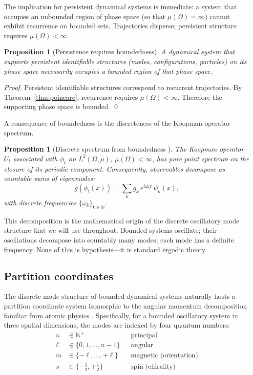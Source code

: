 \documentclass[twocolumn,11pt,a4paper]{article}
\newtheorem{proposition}[theorem]{Proposition}
\theoremstyle{definition}
\theoremstyle{remark}
\newcommand{\Natural}{\mathbb{N}}
\begin{document}
The implication for persistent dynamical systems is immediate: a system that occupies an unbounded region of phase space (so that $\mu(\Omega) = \infty$) cannot exhibit recurrence on bounded sets. Trajectories disperse; persistent structure requires $\mu(\Omega) < \infty$.

\begin{proposition}[Persistence requires boundedness]
\label{prop:bounded}
A dynamical system that supports persistent identifiable structures (modes, configurations, particles) on its phase space necessarily occupies a bounded region of that phase space.
\end{proposition}

\begin{proof}
Persistent identifiable structures correspond to recurrent trajectories. By Theorem~\ref{thm:poincare}, recurrence requires $\mu(\Omega) < \infty$. Therefore the supporting phase space is bounded. \qed
\end{proof}

A consequence of boundedness is the discreteness of the Koopman operator spectrum.

\begin{proposition}[Discrete spectrum from boundedness \citep{koopman1931,mezic2005}]
\label{prop:discrete}
The Koopman operator $U_t$ associated with $\phi_t$ on $L^2(\Omega, \mu)$, $\mu(\Omega) < \infty$, has pure point spectrum on the closure of its periodic component. Consequently, observables decompose as countable sums of eigenmodes:
\begin{equation}
    g(\phi_t(x)) = \sum_{k} g_k \, e^{i\omega_k t} \, \psi_k(x),
\end{equation}
with discrete frequencies $\{\omega_k\}_{k \in \Natural}$.
\end{proposition}

This decomposition is the mathematical origin of the discrete oscillatory mode structure that we will use throughout. Bounded systems oscillate; their oscillations decompose into countably many modes; each mode has a definite frequency. None of this is hypothesis---it is standard ergodic theory.

\subsection{Partition coordinates}

The discrete mode structure of bounded dynamical systems naturally hosts a partition coordinate system isomorphic to the angular momentum decomposition familiar from atomic physics \citep{bohr1913,pauli1925,griffiths2018,landau1977}. Specifically, for a bounded oscillatory system in three spatial dimensions, the modes are indexed by four quantum numbers:
\begin{align}
    n &\in \Natural^+ && \text{principal} \\
    \ell &\in \{0, 1, \ldots, n-1\} && \text{angular} \\
    m &\in \{-\ell, \ldots, +\ell\} && \text{magnetic (orientation)} \\
    s &\in \{-\tfrac{1}{2}, +\tfrac{1}{2}\} && \text{spin (chirality)}
\end{align}
\end{document}
